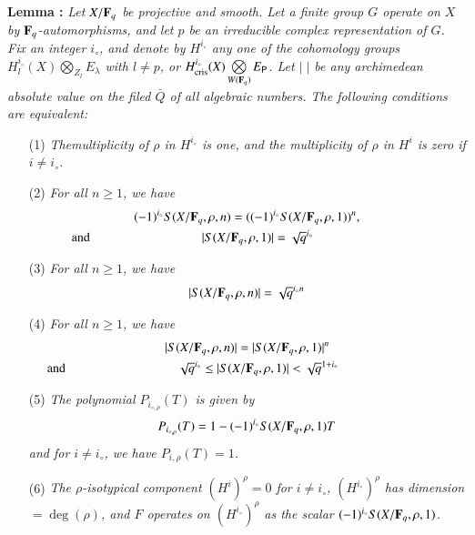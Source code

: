\medskip
\noindent
{\bfseries Lemma :\label{art6-lem1.1}}
\textit{Let $X/\mathbf{F}_q$ be projective and smooth. Let a finite group $G$ operate on $X$ by $\mathbf{F}_q$-automorphisms, and let $p$ be an irreducible complex representation of $G$. Fix an integer $i_\circ$, and denote by $H^{i_\circ}$ any one of the cohomology groups $H^{i_\circ}_l(X) \bigotimes_{Z_l} E_\lambda$ with $l \neq p$, or $H^{i_\circ}_{\text{cris}}(X) \bigotimes\limits_{W(\mathbf{F}_q)} E_{\mathsf{P}}$. Let $|\;|$ be any archimedean absolute value on the filed $\bar{Q}$ of all algebraic numbers. The following conditions are equivalent:}
\begin{enumerate}
\item[(1)] \textit{The\pageoriginale multiplicity of $\rho$ in $H^{i_\circ}$ is one, and the multiplicity of $\rho$ in $H^i$ is zero if $i \neq i_\circ$.}

\item[(2)] \textit{For all $n \geq 1$, we have }
\begin{gather*}
(-1)^{i_\circ} S (X / \bF_q, \rho,n) = ((-1)^{i_\circ} S (X / \bF_q, \rho, 1))^n,\\
\text{and } \hspace{3cm}|S (X / \bF_q, \rho, 1)| = \sqrt{q}^{i_\circ} \hspace{3cm}
\end{gather*}

\item[(3)] \textit{For all $n \geq 1$, we have}
$$
|S(X/ \mathbf{F}_q, \rho, n)| = \sqrt{q}^{i_\circ n}
$$

\item[(4)] \textit{For all $n \geq 1$, we have }
\begin{gather*}
|S (X/ \bF_q, \rho, n)| = |S(X/ \bF_q,  \rho, 1)|^n\\
\text{and } \hspace{3cm} \sqrt{q}^{i_\circ} \leq |S (X / \bF_q, \rho, 1)| < \sqrt{q}^{1+ i_\circ}\hspace{3cm}
\end{gather*}

\item[(5)] \textit{The polynomial $P_{i_{\circ, \rho}} (T)$ is given by}
$$
P_{i_{\circ, \rho}} (T) = 1 - (-1)^{i_\circ} S (X / \mathbf{F}_q, \rho, 1) T 
$$
\textit{and for $i \neq i_\circ$, we have $P_{i,\rho} (T) =1$.}

\item[(6)] \textit{The $\rho$-isotypical component $(H^i)^\rho =0$ for $i \neq i_\circ$, $(H^{i_\circ})^\rho$ has dimension $ = \deg (\rho)$, and $F$ operates on $(H^{i_\circ})^\rho$ as the scalar $(-1)^{i_\circ} S (X/ \mathbf{F}_q, \rho, 1)$.}
\end{enumerate}

